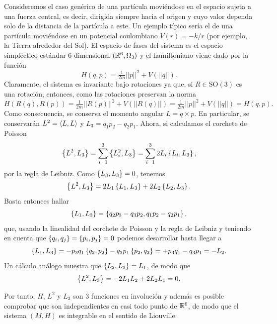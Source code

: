   Consideremos el caso genérico de una partícula moviéndose en el espacio sujeta a una fuerza central, es decir, dirigida siempre hacia el origen y cuyo valor dependa solo de la distancia de la partícula a este. Un ejemplo típico sería el de una partícula moviéndose en un potencial coulombiano $V(r)=-k/r$ (por ejemplo, la Tierra alrededor del Sol). El espacio de fases del sistema es el espacio simpléctico estándar $6$-dimensional $(\mathbb{R}^6,\Omega_3)$ y el hamiltoniano viene dado por la función
  \begin{equation*}
    H(q,p)=\tfrac{1}{2m}||p||^2+V(||q||).
  \end{equation*}
  Claramente, el sistema es invariante bajo rotaciones ya que, si $R\in \mathrm{SO}(3)$ es una rotación, entonces, como las rotaciones preservan la norma
  \begin{equation*}
    H(R(q),R(p))=\tfrac{1}{2m}||R(p)||^2+V(||R(q)||)=\tfrac{1}{2m}||p||^2+V(||q||)=H(q,p).
  \end{equation*}
  Como consecuencia, se conserva el momento angular $L=q\times p$. En particular, se conservarán $L^2=\left\langle L,L\right\rangle$ y $L_3=q_1p_2-q_2p_1$. Ahora, si calculamos el corchete de Poisson
  \begin{equation*}
    \left\lbrace L^2,L_3\right\rbrace=\sum_{i=1}^3\left\lbrace L_i^2,L_3\right\rbrace=\sum_{i=1}^32L_i\left\lbrace L_i,L_3\right\rbrace,
  \end{equation*}
  por la regla de Leibniz. Como $\left\lbrace L_3,L_3\right\rbrace=0$, tenemos 
  \begin{equation*}
    \left\lbrace L^2,L_3\right\rbrace=2L_1\left\lbrace L_1,L_3\right\rbrace+2L_2\left\lbrace L_2,L_3\right\rbrace.
  \end{equation*}
  Basta entonces hallar 
  \begin{equation*}
    \left\lbrace L_1,L_3\right\rbrace=\left\lbrace q_2p_3-q_3p_2,q_1p_2-q_2p_1\right\rbrace,
  \end{equation*}
  que, usando la linealidad del corchete de Poisson y la regla de Leibniz y teniendo en cuenta que $\left\lbrace q_i,q_j\right\rbrace=\left\lbrace p_i,p_j\right\rbrace=0$ podemos desarrollar hasta llegar a
  \begin{equation*}
    \left\lbrace L_1,L_3\right\rbrace=-p_3q_1\left\lbrace q_2,p_2\right\rbrace-q_3p_1\left\lbrace p_2,q_2\right\rbrace=+p_3q_1-q_3p_1=-L_2.
  \end{equation*}
Un cálculo análogo muestra que $\left\lbrace L_2,L_3\right\rbrace=L_1$, de modo que
\begin{equation*}
  \left\lbrace L^2,L_3\right\rbrace=-2L_1L_2+2L_2L_1=0.
\end{equation*}

Por tanto, $H$, $L^2$ y $L_3$ son $3$ funciones en involución y además es posible comprobar que son independientes en casi todo punto de $\mathbb{R}^6$, de modo que el sistema $(M,H)$ es integrable en el sentido de Liouville.

